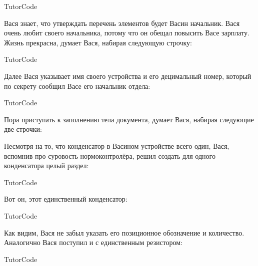 \begin{SaveVerbatim}{TutorCode}
\end{SaveVerbatim}
\colorbox{codecolor}{}

Вася знает, что утверждать перечень элементов будет Васин начальник. Вася очень
любит своего начальника, потому что он обещал повысить Васе зарплату. Жизнь
прекрасна, думает Вася, набирая следующую строчку:

\begin{SaveVerbatim}{TutorCode}
\end{SaveVerbatim}
\colorbox{codecolor}{}

Далее Вася указывает имя своего устройства и его децимальный номер, который
по секрету сообщил Васе его начальник отдела:

\begin{SaveVerbatim}{TutorCode}
\end{SaveVerbatim}
\colorbox{codecolor}{}

Пора приступать к заполнению тела документа, думает Вася, набирая следующие
две строчки:

\colorbox{codecolor}{}

Несмотря на то, что конденсатор в Васином устройстве всего один, Вася, вспомнив
про суровость нормоконтролёра,  решил создать для одного конденсатора целый
раздел:

\begin{SaveVerbatim}{TutorCode}
\end{SaveVerbatim}
\colorbox{codecolor}{}

Вот он, этот единственный конденсатор:

\begin{SaveVerbatim}{TutorCode}
\end{SaveVerbatim}
\colorbox{codecolor}{}

Как видим, Вася не забыл указать его позиционное обозначение и
количество. Аналогично Вася поступил и с единственным резистором:

\begin{SaveVerbatim}{TutorCode}
\end{SaveVerbatim}
\colorbox{codecolor}{}

